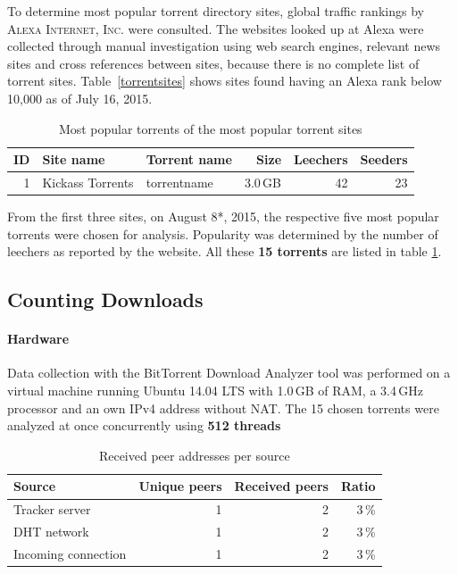 \documentclass[10pt, a4paper, twoside]{scrartcl}
\renewcommand{\_}{\origunderscore\allowbreak}
\begin{document}
To determine most popular torrent directory sites, global traffic rankings by \textsc{Alexa Internet, Inc.} \cite{alexa} were consulted. The websites looked up at Alexa were collected through manual investigation using web search engines, relevant news sites and cross references between sites, because there is no complete list of torrent sites. Table~\ref{torrentsites} shows sites found having an Alexa rank below 10,000 as of July 16, 2015.

\begin{table}
\centering
\begin{tabular}{rllrrr}
\toprule
ID & Site name & Torrent name & Size & Leechers & Seeders \\
\midrule
1 & Kickass Torrents & torrent\_name & 3.0\,GB & 42 & 23 \\
\bottomrule
\end{tabular}
\caption{Most popular torrents of the most popular torrent sites}
\label{torrents}
\end{table}

From the first three sites, on August 8*, 2015, the respective five most popular torrents were chosen for analysis. Popularity was determined by the number of leechers as reported by the website. All these \textbf{15 torrents} are listed in table \ref{torrents}.

\subsection{Counting Downloads}
\paragraph{Hardware}
Data collection with the BitTorrent Download Analyzer tool was performed on a virtual machine running Ubuntu 14.04 LTS with 1.0\,GB of RAM, a 3.4\,GHz processor and an own IPv4 address without NAT. The 15 chosen torrents were analyzed at once concurrently using \textbf{512 threads}

\begin{table}
\centering
\begin{tabular}{lrrr}
\toprule
Source & Unique peers & Received peers & Ratio \\
\midrule
Tracker server & 1 & 2 & 3\,\% \\
DHT network & 1 & 2 & 3\,\% \\
Incoming connection & 1 & 2 & 3\,\% \\
\bottomrule
\end{tabular}
\caption{Received peer addresses per source}
\label{unique-peers}
\end{table}
\end{document}
